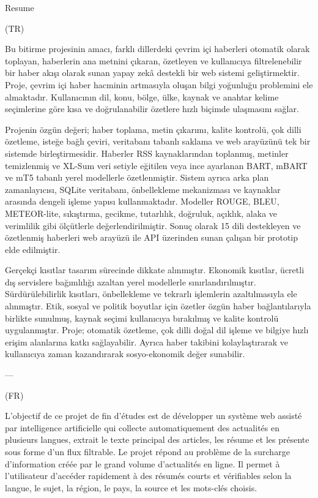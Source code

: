 Resume

(TR)

Bu bitirme projesinin amacı, farklı dillerdeki çevrim içi haberleri otomatik olarak toplayan, haberlerin ana metnini çıkaran, özetleyen ve kullanıcıya filtrelenebilir bir haber akışı olarak sunan yapay zekâ destekli bir web sistemi geliştirmektir. Proje, çevrim içi haber hacminin artmasıyla oluşan bilgi yoğunluğu problemini ele almaktadır. Kullanıcının dil, konu, bölge, ülke, kaynak ve anahtar kelime seçimlerine göre kısa ve doğrulanabilir özetlere hızlı biçimde ulaşmasını sağlar.

Projenin özgün değeri; haber toplama, metin çıkarımı, kalite kontrolü, çok dilli özetleme, isteğe bağlı çeviri, veritabanı tabanlı saklama ve web arayüzünü tek bir sistemde birleştirmesidir. Haberler RSS kaynaklarından toplanmış, metinler temizlenmiş ve XL-Sum veri setiyle eğitilen veya ince ayarlanan BART, mBART ve mT5 tabanlı yerel modellerle özetlenmiştir. Sistem ayrıca arka plan zamanlayıcısı, SQLite veritabanı, önbellekleme mekanizması ve kaynaklar arasında dengeli işleme yapısı kullanmaktadır. Modeller ROUGE, BLEU, METEOR-lite, sıkıştırma, gecikme, tutarlılık, doğruluk, açıklık, alaka ve verimlilik gibi ölçütlerle değerlendirilmiştir. Sonuç olarak 15 dili destekleyen ve özetlenmiş haberleri web arayüzü ile API üzerinden sunan çalışan bir prototip elde edilmiştir.

Gerçekçi kısıtlar tasarım sürecinde dikkate alınmıştır. Ekonomik kısıtlar, ücretli dış servislere bağımlılığı azaltan yerel modellerle sınırlandırılmıştır. Sürdürülebilirlik kısıtları, önbellekleme ve tekrarlı işlemlerin azaltılmasıyla ele alınmıştır. Etik, sosyal ve politik boyutlar için özetler özgün haber bağlantılarıyla birlikte sunulmuş, kaynak seçimi kullanıcıya bırakılmış ve kalite kontrolü uygulanmıştır. Proje; otomatik özetleme, çok dilli doğal dil işleme ve bilgiye hızlı erişim alanlarına katkı sağlayabilir. Ayrıca haber takibini kolaylaştırarak ve kullanıcıya zaman kazandırarak sosyo-ekonomik değer sunabilir.

---

(FR)

L’objectif de ce projet de fin d’études est de développer un système web assisté par intelligence artificielle qui collecte automatiquement des actualités en plusieurs langues, extrait le texte principal des articles, les résume et les présente sous forme d’un flux filtrable. Le projet répond au problème de la surcharge d’information créée par le grand volume d’actualités en ligne. Il permet à l’utilisateur d’accéder rapidement à des résumés courts et vérifiables selon la langue, le sujet, la région, le pays, la source et les mots-clés choisis.

